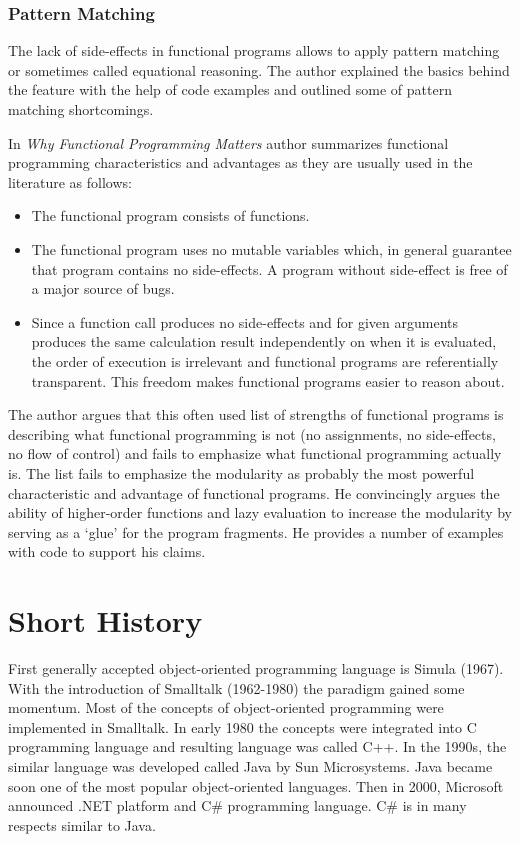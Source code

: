 \documentclass[12pt,twoside,a4paper]{report}
\begin{document}
\subsubsection{Pattern Matching}
The lack of side-effects in functional programs allows to apply pattern matching or sometimes called equational reasoning. The author explained the basics behind the feature with the help of code examples and outlined some of pattern matching shortcomings.\par
In \emph{Why Functional Programming Matters}\cite{14} author summarizes functional programming characteristics and advantages as they are usually used in the literature as follows:
\begin{itemize}\itemsep1pt \parskip0pt 
\item The functional program consists of functions.
\item The functional program uses no mutable variables which, in general guarantee that program contains no side-effects. A program without side-effect is free of a major source of bugs.
\item Since a function call produces no side-effects and for given arguments produces the same calculation result independently on when it is evaluated, the order of execution is irrelevant and functional programs are referentially transparent. This freedom makes functional programs easier to reason about.
\end{itemize}

The author argues that this often used list of strengths of functional programs is describing what functional programming is not (no assignments, no side-effects, no flow of control) and fails to emphasize what functional programming actually is. The list fails to emphasize the modularity as probably the most powerful characteristic and advantage of functional programs. He convincingly argues the ability of higher-order functions and lazy evaluation to increase the modularity by serving as a ‘glue’ for the program fragments. He provides a number of examples with code to support his claims.

\section{Short History}\label{2.4}

First generally accepted object-oriented programming language is Simula (1967). With the introduction of Smalltalk (1962-1980) the paradigm gained some momentum. Most of the concepts of object-oriented programming were implemented in Smalltalk. In early 1980 the concepts were integrated into C programming language and resulting language was called C++. In the 1990s, the similar language was developed called Java by Sun Microsystems. Java became soon one of the most popular object-oriented languages. Then in 2000, Microsoft announced .NET platform and C\# programming language. C\# is in many respects similar to Java. \cite{13}
\end{document}
